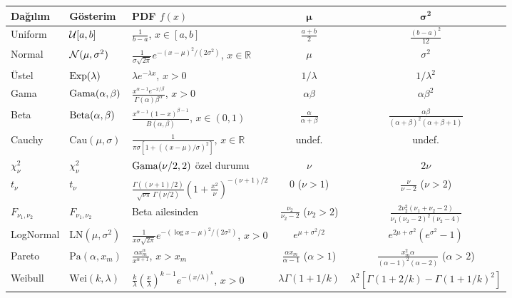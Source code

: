 \begin{center}
\renewcommand{\arraystretch}{1.7}
\small
\begin{tabular}{p{2.2cm}p{1.6cm}p{4.5cm}cc}
\hline
\textbf{Dağılım} & \textbf{Gösterim} & \textbf{PDF} $f(x)$ & $\boldsymbol{\mu}$ & $\boldsymbol{\sigma^2}$ \\
\hline
Uniform & $\mathcal{U}[a,b]$ & $\frac{1}{b-a}$, $x\in[a,b]$ & $\frac{a+b}{2}$ & $\frac{(b-a)^2}{12}$ \\[4pt]
Normal & $\mathcal{N}(\mu,\sigma^2)$ & $\frac{1}{\sigma\sqrt{2\pi}}e^{-(x-\mu)^2/(2\sigma^2)}$, $x\in\mathbb{R}$ & $\mu$ & $\sigma^2$ \\[4pt]
Üstel & $\operatorname{Exp}(\lambda)$ & $\lambda e^{-\lambda x}$, $x>0$ & $1/\lambda$ & $1/\lambda^2$ \\[4pt]
Gama & $\operatorname{Gama}(\alpha,\beta)$ & $\frac{x^{\alpha-1}e^{-x/\beta}}{\Gamma(\alpha)\beta^\alpha}$, $x>0$ & $\alpha\beta$ & $\alpha\beta^2$ \\[4pt]
Beta & $\operatorname{Beta}(\alpha,\beta)$ & $\frac{x^{\alpha-1}(1-x)^{\beta-1}}{B(\alpha,\beta)}$, $x\in(0,1)$ & $\frac{\alpha}{\alpha+\beta}$ & $\frac{\alpha\beta}{(\alpha+\beta)^2(\alpha+\beta+1)}$ \\[4pt]
Cauchy & $\mathrm{Cau}(\mu,\sigma)$ & $\frac{1}{\pi\sigma[1+((x-\mu)/\sigma)^2]}$, $x\in\mathbb{R}$ & undef. & undef. \\[4pt]
$\chi^2_\nu$ & $\chi^2_\nu$ & $\operatorname{Gama}(\nu/2,2)$ özel durumu & $\nu$ & $2\nu$ \\[4pt]
$t_\nu$ & $t_\nu$ & $\frac{\Gamma((\nu+1)/2)}{\sqrt{\nu\pi}\,\Gamma(\nu/2)}\!\left(1+\frac{x^2}{\nu}\right)^{-(\nu+1)/2}$ & $0$ ($\nu>1$) & $\frac{\nu}{\nu-2}$ ($\nu>2$) \\[4pt]
$F_{\nu_1,\nu_2}$ & $F_{\nu_1,\nu_2}$ & Beta ailesinden & $\frac{\nu_2}{\nu_2-2}$ ($\nu_2>2$) & $\frac{2\nu_2^2(\nu_1+\nu_2-2)}{\nu_1(\nu_2-2)^2(\nu_2-4)}$ \\[4pt]
LogNormal & $\mathrm{LN}(\mu,\sigma^2)$ & $\frac{1}{x\sigma\sqrt{2\pi}}e^{-(\log x-\mu)^2/(2\sigma^2)}$, $x>0$ & $e^{\mu+\sigma^2/2}$ & $e^{2\mu+\sigma^2}(e^{\sigma^2}-1)$ \\[4pt]
Pareto & $\mathrm{Pa}(\alpha,x_m)$ & $\frac{\alpha x_m^\alpha}{x^{\alpha+1}}$, $x>x_m$ & $\frac{\alpha x_m}{\alpha-1}$ ($\alpha>1$) & $\frac{x_m^2\alpha}{(\alpha-1)^2(\alpha-2)}$ ($\alpha>2$) \\[4pt]
Weibull & $\mathrm{Wei}(k,\lambda)$ & $\frac{k}{\lambda}\!\left(\frac{x}{\lambda}\right)^{k-1}e^{-(x/\lambda)^k}$, $x>0$ & $\lambda\Gamma(1+1/k)$ & $\lambda^2[\Gamma(1+2/k)-\Gamma(1+1/k)^2]$ \\
\hline
\end{tabular}
\end{center}


